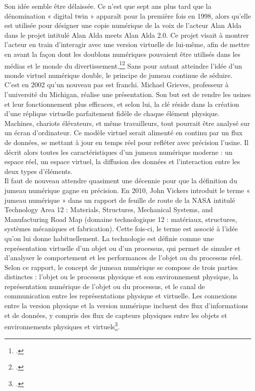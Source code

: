 Son idée semble être délaissée. Ce n'est que sept ans plus tard que la dénomination « digital twin » apparaît pour la première fois en 1998, alors qu'elle est utilisée pour désigner une copie numérique de la voix de l'acteur Alan Alda dans le projet intitulé Alan Alda meets Alan Alda 2.0. Ce projet visait à montrer l’acteur en train d’interagir avec une version virtuelle de lui-même,  afin de mettre en avant la façon dont les doublons numériques pouvaient être utilisés dans les médias et le monde du divertissement.\footcite{miskinisMysteriousHistoryDigital2019}\footcite{onceaDigitalTwinsApollo2024} Sans pour autant atteindre l'idée d'un monde virtuel numérique double, le principe de jumeau continue de séduire.\\

C'est en 2002 qu'un nouveau pas est franchi. Michael Grieves, professeur à l'université du Michigan, réalise une présentation. Son but est de rendre les usines et leur fonctionnement plus efficaces, et selon lui, la clé réside dans la création d’une réplique virtuelle parfaitement fidèle de chaque élément physique. Machines, chariots élévateurs, et même travailleurs, tout pourrait être analysé sur un écran d'ordinateur. Ce modèle virtuel serait alimenté en continu par un flux de données, se mettant à jour en temps réel pour refléter avec précision l’usine. Il décrit alors toutes les caractéristiques d’un jumeau numérique moderne : un espace réel, un espace virtuel, la diffusion des données et l’interaction entre les deux types d’éléments.\\

Il faut de nouveau attendre quasiment une décennie pour que la définition du jumeau numérique gagne en précision. En 2010, John Vickers introduit le terme « jumeau numérique » dans un rapport de feuille de route de la NASA intitulé  Technology Area 12 : Materials, Structures, Mechanical Systems, and Manufacturing Road Map (domaine technologique 12 : matériaux, structures, systèmes mécaniques et fabrication). Cette fois-ci, le terme est associé à l'idée qu'on lui donne habituellement. La technologie est définie comme une représentation virtuelle d'un objet ou d'un processus, qui permet de simuler et d'analyser le comportement et les performances de l'objet ou du processus réel. Selon ce rapport, le concept de jumeau numérique se compose de trois parties distinctes : l'objet ou le processus physique et son environnement physique, la représentation numérique de l'objet ou du processus, et le canal de communication entre les représentations physique et virtuelle. Les connexions entre la version physique et la version numérique incluent des flux d'informations et de données, y compris des flux de capteurs physiques entre les objets et environnements physiques et virtuels\footcite{JumeauxNumeriquesGuide}. \\


